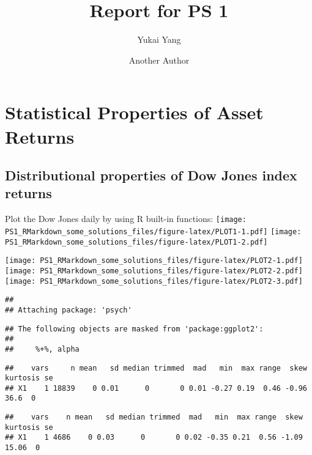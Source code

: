 \documentclass[
]{article}
\title{Report for PS 1}
\author{Yukai Yang \and Another Author}
\date{}
\begin{document}
\maketitle

\hypertarget{statistical-properties-of-asset-returns}{%
\section{Statistical Properties of Asset
Returns}\label{statistical-properties-of-asset-returns}}

\hypertarget{distributional-properties-of-dow-jones-index-returns}{%
\subsection{Distributional properties of Dow Jones index
returns}\label{distributional-properties-of-dow-jones-index-returns}}

Plot the Dow Jones daily by using R built-in functions:
\texttt{[image: PS1\_RMarkdown\_some\_solutions\_files/figure-latex/PLOT1-1.pdf]}
\texttt{[image: PS1\_RMarkdown\_some\_solutions\_files/figure-latex/PLOT1-2.pdf]}

\texttt{[image: PS1\_RMarkdown\_some\_solutions\_files/figure-latex/PLOT2-1.pdf]}
\texttt{[image: PS1\_RMarkdown\_some\_solutions\_files/figure-latex/PLOT2-2.pdf]}
\texttt{[image: PS1\_RMarkdown\_some\_solutions\_files/figure-latex/PLOT2-3.pdf]}

\begin{verbatim}
## 
## Attaching package: 'psych'
\end{verbatim}

\begin{verbatim}
## The following objects are masked from 'package:ggplot2':
## 
##     %+%, alpha
\end{verbatim}

\begin{verbatim}
##    vars     n mean   sd median trimmed  mad   min  max range  skew kurtosis se
## X1    1 18839    0 0.01      0       0 0.01 -0.27 0.19  0.46 -0.96     36.6  0
\end{verbatim}

\begin{verbatim}
##    vars    n mean   sd median trimmed  mad   min  max range  skew kurtosis se
## X1    1 4686    0 0.03      0       0 0.02 -0.35 0.21  0.56 -1.09    15.06  0
\end{verbatim}
\end{document}
